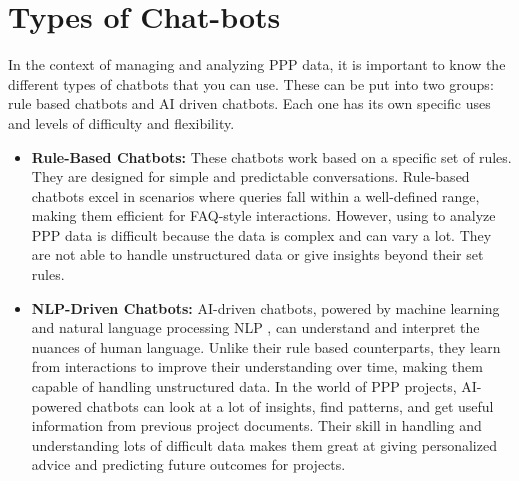 \section{Types of Chat-bots}
In the context of managing and analyzing PPP data, it is important to know the different types of chatbots that you can use. These can be put into two groups: rule based chatbots and AI driven chatbots. Each one has its own specific uses and levels of difficulty and flexibility.
\vskip 0.5cm
\begin{itemize}
\item \textbf{Rule-Based Chatbots:} These chatbots work based on a specific set of rules. They are designed for simple and predictable conversations. Rule-based chatbots excel in scenarios where queries fall within a well-defined range, making them efficient for FAQ-style interactions. However, using to analyze PPP data is difficult because the data is complex and can vary a lot. They are not able to handle unstructured data or give insights beyond their set rules.
\vskip 0.5cm
\item \textbf{NLP-Driven Chatbots:} AI-driven chatbots, powered by machine learning and natural language processing NLP , can understand and interpret the nuances of human language. Unlike their rule based counterparts, they learn from interactions to improve their understanding over time, making them capable of handling unstructured data. In the world of PPP projects, AI-powered chatbots can look at a lot of insights, find patterns, and get useful information from previous project documents. Their skill in handling and understanding lots of difficult data makes them great at giving personalized advice and predicting future outcomes for projects.

\end{itemize}
